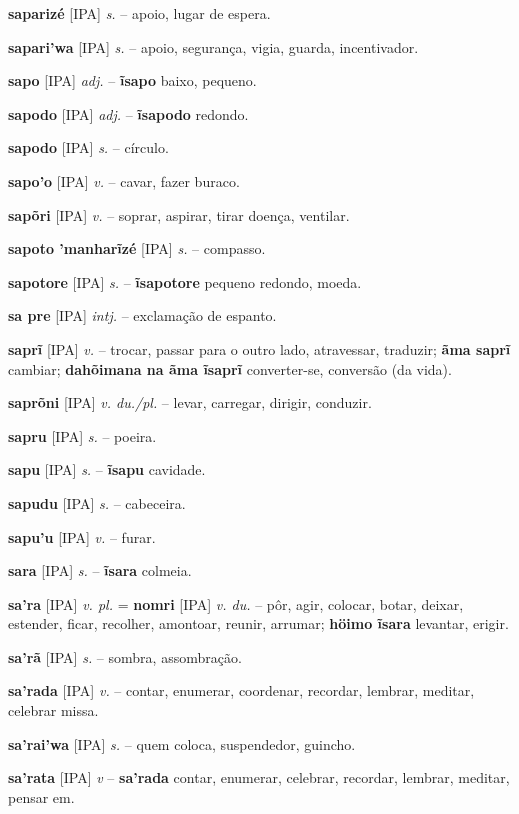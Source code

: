 \textbf{saparizé} [IPA] \textit{s.} -- apoio, lugar de espera.

\textbf{sapari'wa} [IPA] \textit{s.} -- apoio, segurança, vigia, guarda, incentivador.

\textbf{sapo} [IPA] \textit{adj.} -- \textbf{ĩsapo} baixo, pequeno.

\textbf{sapodo} [IPA] \textit{adj.} -- \textbf{ĩsapodo} redondo.

\textbf{sapodo} [IPA] \textit{s.} -- círculo.

\textbf{sapo'o} [IPA] \textit{v.} -- cavar, fazer buraco.

\textbf{sapõri} [IPA] \textit{v.} -- soprar, aspirar, tirar doença, ventilar.

\textbf{sapoto 'manharĩzé} [IPA] \textit{s.} -- compasso.

\textbf{sapotore} [IPA] \textit{s.} -- \textbf{ĩsapotore} pequeno redondo, moeda.

\textbf{sa pre} [IPA] \textit{intj.} -- exclamação de espanto.

\textbf{saprĩ} [IPA] \textit{v.} -- trocar, passar para o outro lado, atravessar, traduzir; \textbf{ãma saprĩ} cambiar; \textbf{dahõimana na ãma ĩsaprĩ} converter-se, conversão (da vida).

\textbf{saprõni} [IPA] \textit{v. du./pl.} -- levar, carregar, dirigir, conduzir.

\textbf{sapru} [IPA] \textit{s.} -- poeira.

\textbf{sapu} [IPA] \textit{s.} -- \textbf{ĩsapu} cavidade.

\textbf{sapudu} [IPA] \textit{s.} -- cabeceira.

\textbf{sapu'u} [IPA] \textit{v.} -- furar.

\textbf{sara} [IPA] \textit{s.} -- \textbf{ĩsara} colmeia.

\textbf{sa'ra} [IPA] \textit{v. pl.} = \textbf{nomri} [IPA] \textit{v. du.} -- pôr, agir, colocar, botar, deixar, estender, ficar, recolher, amontoar, reunir, arrumar; \textbf{höimo ĩsara} levantar, erigir.

\textbf{sa'rã} [IPA] \textit{s.} -- sombra, assombração.

\textbf{sa'rada} [IPA] \textit{v.} -- contar, enumerar, coordenar, recordar, lembrar, meditar, celebrar missa.

\textbf{sa'rai'wa} [IPA] \textit{s.} -- quem coloca, suspendedor, guincho.

\textbf{sa'rata} [IPA] \textit{v} -- \textbf{sa'rada} contar, enumerar, celebrar, recordar, lembrar, meditar, pensar em.

